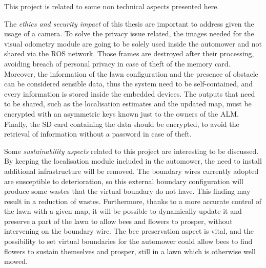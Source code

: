 \noindent 
This project is related to some non technical aspects presented here.

The \textit{ethics and security impact} of this thesis are important to address given the usage of a camera.
To solve the privacy issue related, the images needed for the visual odometry module are going to be solely used inside the automower and not shared via the \gls{ROS} network.
Those frames are destroyed after their processing, avoiding breach of personal privacy in case of theft of the memory card.
Moreover, the information of the lawn configuration and the presence of obstacle can be considered sensible data, thus the system need to be self-contained, and every information is stored inside the embedded devices.
The outputs that need to be shared, such as the localisation estimates and the updated map, must be encrypted with an asymmetric keys known just to the owners of the \gls{ALM}.
Finally, the SD card containing the data should be encrypted, to avoid the retrieval of information without a password in case of theft.

Some \textit{sustainability aspects} related to this project are interesting to be discussed.
By keeping the localisation module included in the automower, the need to install additional infrastructure will be removed.
The boundary wires currently adopted are susceptible to deterioration, so this external boundary configuration will produce some wastes that the virtual boundary do not have.
This finding may result in a reduction of wastes.
Furthermore, thanks to a more accurate control of the lawn with a given map, it will be possible to dynamically update it and preserve a part of the lawn to allow bees and flowers to prosper, without intervening on the boundary wire.
The bee preservation aspect is vital, and the possibility to set virtual boundaries for the automower could allow bees to find flowers to sustain themselves and prosper, still in a lawn which is otherwise well mowed.



